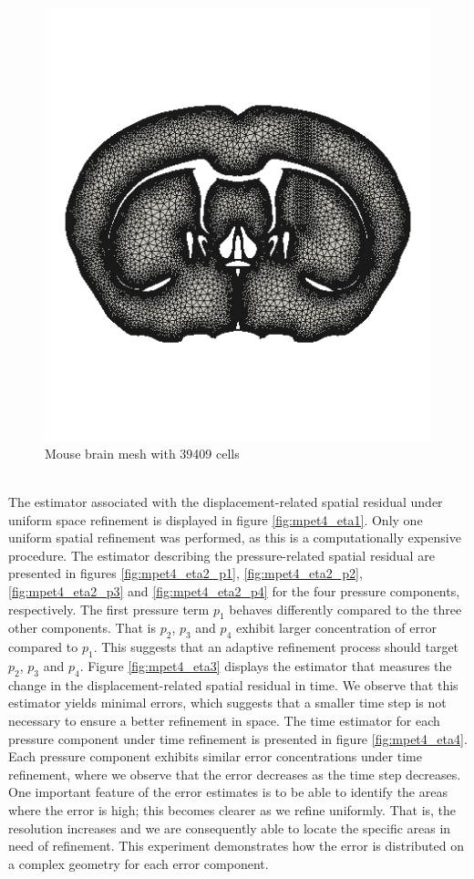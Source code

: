 \begin{figure}[h!]
\centering
  \includegraphics[scale=0.5]{figures/4_mpet/biomedical/brain_mesh.png}
  \caption[Caption for LOF]{Mouse brain mesh\footnotemark{} with 39409 cells }
  \label{fig:brain_mesh}
\end{figure}
\mbox{}\\
The estimator associated with the displacement-related spatial residual under uniform space refinement is displayed in figure \ref{fig:mpet4_eta1}. Only one uniform spatial refinement was performed, as this is a computationally expensive procedure. The estimator describing the pressure-related spatial residual are presented in figures \ref{fig:mpet4_eta2_p1}, \ref{fig:mpet4_eta2_p2}, \ref{fig:mpet4_eta2_p3} and \ref{fig:mpet4_eta2_p4} for the four pressure components, respectively. The first pressure term $p_1$ behaves differently compared to the three other components. That is $p_2$, $p_3$ and $p_4$ exhibit larger concentration of error compared to $p_1$. This suggests that an adaptive refinement process should target $p_2$, $p_3$ and $p_4$. Figure \ref{fig:mpet4_eta3} displays the estimator that measures the change in the displacement-related spatial residual in time. We observe that this estimator yields minimal errors, which suggests that a smaller time step is not necessary to ensure a better refinement in space. The time estimator for each pressure component under time refinement is presented in figure \ref{fig:mpet4_eta4}. Each pressure component exhibits similar error concentrations under time refinement, where we observe that the error decreases as the time step decreases. One important feature of the error estimates is to be able to identify the areas where the error is high; this becomes clearer as we refine uniformly. That is, the resolution increases and we are consequently able to locate the specific areas in need of refinement. This experiment demonstrates how the error is distributed on a complex geometry for each error component. 
